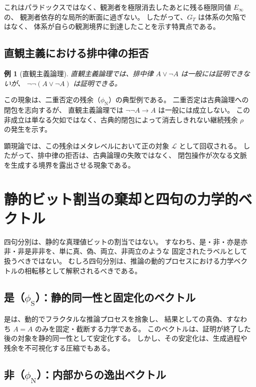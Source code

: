 \documentclass[11pt,a4paper]{ltjsarticle}
\newtheorem{example}{例}
\newcommand{\phiS}{\phi_{\text{S}}}
\newcommand{\phiN}{\phi_{\text{N}}}
\newcommand{\Einfty}{E_{\infty}}
\newcommand{\Lhagma}{\mathcal{L}}
\begin{document}
これはパラドックスではなく、観測者を極限消去したあとに残る極限同値 $\Einfty$ の、
観測者依存的な局所的断面に過ぎない。
したがって、$G_T$ は体系の欠陥ではなく、
体系が自らの観測境界に到達したことを示す特異点である。

\subsection{直観主義における排中律の拒否}

\begin{example}[直観主義論理]
  直観主義論理では、排中律 $A \lor \neg A$ は一般には証明できないが、
  $\neg\neg(A \lor \neg A)$ は証明できる。
\end{example}

この現象は、二重否定の残余（$\phiN$）の典型例である。
二重否定は古典論理への閉包を志向するが、
直観主義論理では $\neg\neg A \to A$ は一般には成立しない。
この非成立は単なる欠如ではなく、古典的閉包によって消去しきれない継続残余 $\rho$ の発生を示す。

顕現論では、この残余はメタレベルにおいて正の対象 $\Lhagma$ として回収される。
したがって、排中律の拒否は、古典論理の失敗ではなく、
閉包操作が次なる文脈を生成する境界を露出させる現象である。

\section{静的ビット割当の棄却と四句の力学的ベクトル}

四句分別は、静的な真理値ビットの割当ではない。
すなわち、是・非・亦是亦非・非是非非を、単に真、偽、両立、非両立のような
固定されたラベルとして扱うべきではない。
むしろ四句分別は、推論の動的プロセスにおける力学ベクトルの相転移として解釈されるべきである。

\subsection{是（\texorpdfstring{$\phiS$}{phiS}）：静的同一性と固定化のベクトル}

是は、動的でフラクタルな推論プロセスを捨象し、
結果としての真偽、すなわち $A=A$ のみを固定・截断する力学である。
このベクトルは、証明が終了した後の対象を静的同一性として安定化する。
しかし、その安定化は、生成過程や残余を不可視化する圧縮でもある。

\subsection{非（\texorpdfstring{$\phiN$}{phiN}）：内部からの逸出ベクトル}
\end{document}
